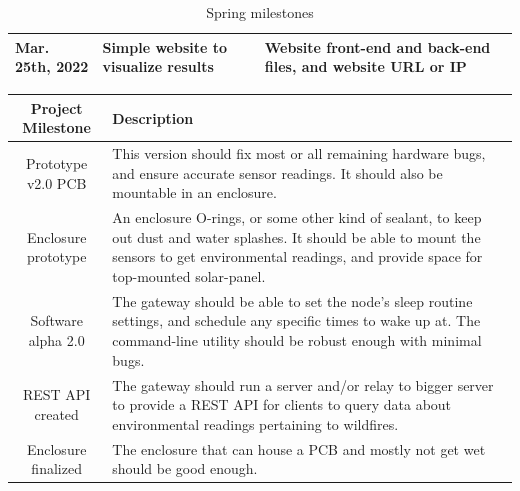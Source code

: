 \documentclass[titlepage, 11pt, letterpaper]{article}
\begin{document}
\begin{table}[H]
\begin{tabularx}{\linewidth}{|X|X|X|}
        \hline
        Mar. 25th, 2022
        & Simple website to visualize results
        & Website front-end and back-end files, and website URL or IP
        \\
        
        
        \hline
    \end{tabularx}
    \caption{Spring milestones}
\end{table}
%
%
\begin{table}[H]    
    \centering
    \begin{tabularx}{\linewidth}{|c|X|}
        \hline
        Project Milestone & Description 
        \\
        \hline\hline
        Prototype v2.0 PCB 
        & This version should fix most or all remaining hardware bugs, and ensure accurate sensor readings. It should also be mountable in an enclosure.
        \\
        
        \hline
        Enclosure prototype
        & An enclosure O-rings, or some other kind of sealant, to keep out dust and water splashes. It should be able to mount the sensors to get environmental readings, and provide space for top-mounted solar-panel.
        \\
        
        \hline
        Software alpha 2.0 
        & The gateway should be able to set the node's sleep routine settings, and schedule any specific times to wake up at. The command-line utility should be robust enough with minimal bugs.
        \\
        
        \hline
        REST API created
        & The gateway should run a server and/or relay to bigger server to provide a REST API for clients to query data about environmental readings pertaining to wildfires.
        \\
        
        \hline
        Enclosure finalized
        & The enclosure that can house a PCB and mostly not get wet should be good enough.
        \\
        

\end{tabularx}
\end{table}
\end{document}
